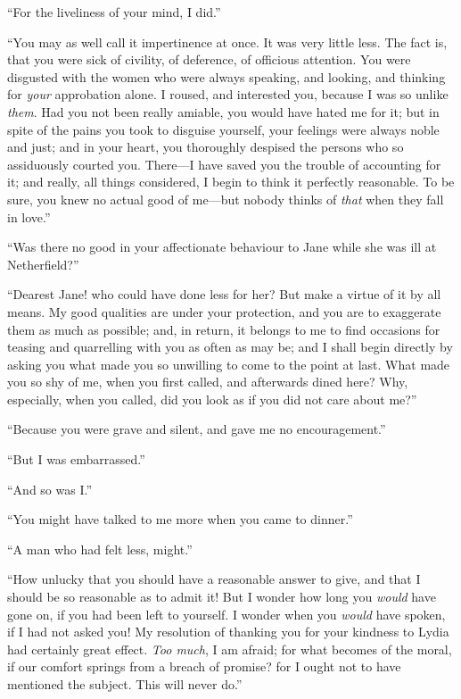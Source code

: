``For the liveliness of your mind, I did.''

``You may as well call it impertinence at once.  It was very
little less.  The fact is, that you were sick of civility, of
deference, of officious attention.  You were disgusted with
the women who were always speaking, and looking, and thinking
for \emph{your} approbation alone.  I roused, and interested you,
because I was so unlike \emph{them}.  Had you not been really
amiable, you would have hated me for it; but in spite of the
pains you took to disguise yourself, your feelings were always
noble and just; and in your heart, you thoroughly despised the
persons who so assiduously courted you.  There---I have saved
you the trouble of accounting for it; and really, all things
considered, I begin to think it perfectly reasonable.  To be
sure, you knew no actual good of me---but nobody thinks of
\emph{that} when they fall in love.''

``Was there no good in your affectionate behaviour to Jane while
she was ill at Netherfield?''

``Dearest Jane! who could have done less for her?  But make a
virtue of it by all means.  My good qualities are under your
protection, and you are to exaggerate them as much as possible;
and, in return, it belongs to me to find occasions for teasing
and quarrelling with you as often as may be; and I shall begin
directly by asking you what made you so unwilling to come to
the point at last.  What made you so shy of me, when you first
called, and afterwards dined here?  Why, especially, when you
called, did you look as if you did not care about me?''

``Because you were grave and silent, and gave me no encouragement.''

``But I was embarrassed.''

``And so was I.''

``You might have talked to me more when you came to dinner.''

``A man who had felt less, might.''

``How unlucky that you should have a reasonable answer to give,
and that I should be so reasonable as to admit it!  But I
wonder how long you \emph{would} have gone on, if you had been left
to yourself.  I wonder when you \emph{would} have spoken, if I
had not asked you!  My resolution of thanking you for your
kindness to Lydia had certainly great effect.  \emph{Too much}, I am
afraid; for what becomes of the moral, if our comfort springs
from a breach of promise?  for I ought not to have mentioned
the subject.  This will never do.''

